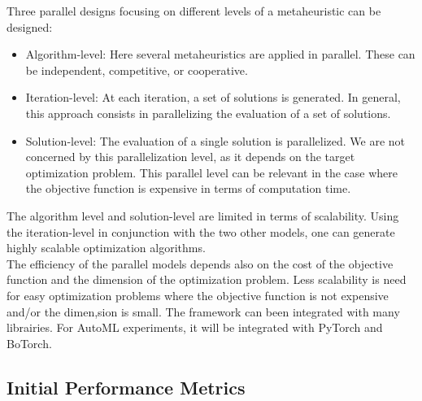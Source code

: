 Three parallel designs focusing on different levels of a metaheuristic can be designed:
\begin{itemize}
    \item Algorithm-level: Here several metaheuristics are applied in parallel. These can be independent, competitive, or cooperative.
    \item Iteration-level: At each iteration, a set of solutions is generated. In general, this approach consists in parallelizing the evaluation of a set of solutions.
    \item Solution-level: The evaluation of a single solution is parallelized. We are not concerned by this parallelization level, as it depends on the target optimization problem. This parallel level can be relevant in the case where the objective function is expensive in terms of computation time.
\end{itemize}
    
The algorithm level and solution-level are limited in terms of scalability. Using the iteration-level in conjunction with the two other models, one can generate highly scalable optimization algorithms. \\

The efficiency of the parallel models depends also on the cost of the objective function and the dimension of the optimization problem. Less scalability is need for easy optimization problems where the objective function is not expensive and/or the dimen,sion is small. The framework can been integrated with many librairies. For AutoML experiments, it will be integrated with PyTorch and BoTorch.

\subsection{Initial Performance Metrics}
\label{sec:WP5:Zellij:metrics}

